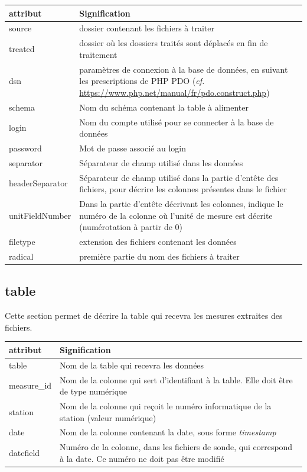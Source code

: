 \documentclass[12pt,a4paper]{article}
\begin{document}
\begin{tabular}{|l|>{\raggedright\arraybackslash}p{12cm}|}
\hline 
attribut & Signification \\ 
\hline 
source & dossier contenant les fichiers à traiter  \\ 
treated & dossier où les dossiers traités sont déplacés en fin de traitement \\ 
dsn & paramètres de connexion à la base de données, en suivant les prescriptions de PHP PDO (\textit{cf.} \href{https://www.php.net/manual/fr/pdo.construct.php}{https://www.php.net/manual/fr/pdo.construct.php}) \\ 
schema &  Nom du schéma contenant la table à alimenter\\ 
login & Nom du compte utilisé pour se connecter à la base de données \\ 
password & Mot de passe associé au login \\ 
separator & Séparateur de champ utilisé dans les données \\ 
headerSeparator & Séparateur de champ utilisé dans la partie d'entête des fichiers, pour décrire les colonnes présentes dans le fichier\\ 
unitFieldNumber & Dans la partie d'entête décrivant les colonnes, indique le numéro de la colonne où l'unité de mesure est décrite (numérotation à partir de 0) \\ 
filetype & extension des fichiers contenant les données \\
radical & première partie du nom des fichiers à traiter \\
\hline 
\end{tabular} 

\subsection{table}

Cette section permet de décrire la table qui recevra les mesures extraites des fichiers.

\begin{tabular}{|l|>{\raggedright\arraybackslash}p{12cm}|}
\hline 
attribut & Signification \\ 
\hline 
table & Nom de la table qui recevra les données \\
measure\_id & Nom de la colonne qui sert d'identifiant à la table. Elle doit être de type numérique\\
station & Nom de la colonne qui reçoit le numéro informatique de la station (valeur numérique)\\
date & Nom de la colonne contenant la date, sous forme \textit{timestamp}\\
datefield & Numéro de la colonne, dans les fichiers de sonde, qui correspond à la date. Ce numéro ne doit pas être modifié \\
\hline 
\end{tabular} 
\end{document}
